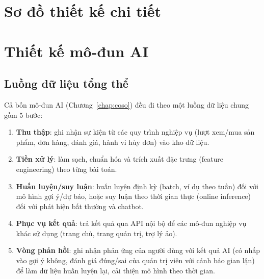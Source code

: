 \section{Sơ đồ thiết kế chi tiết}
\label{sec:sddchitiet}


\section{Thiết kế mô-đun AI}
\label{sec:thietkeAI}

\subsection{Luồng dữ liệu tổng thể}

Cả bốn mô-đun AI (Chương~\ref{chap:coso}) đều đi theo một luồng dữ liệu chung gồm 5 bước:
\begin{enumerate}
    \item \textbf{Thu thập}: ghi nhận sự kiện từ các quy trình nghiệp vụ (lượt xem/mua sản phẩm, đơn hàng, đánh giá, hành vi hủy đơn) vào kho dữ liệu.
    \item \textbf{Tiền xử lý}: làm sạch, chuẩn hóa và trích xuất đặc trưng (feature engineering) theo từng bài toán.
    \item \textbf{Huấn luyện/suy luận}: huấn luyện định kỳ (batch, ví dụ theo tuần) đối với mô hình gợi ý/dự báo, hoặc suy luận theo thời gian thực (online inference) đối với phát hiện bất thường và chatbot.
    \item \textbf{Phục vụ kết quả}: trả kết quả qua API nội bộ để các mô-đun nghiệp vụ khác sử dụng (trang chủ, trang quản trị, trợ lý ảo).
    \item \textbf{Vòng phản hồi}: ghi nhận phản ứng của người dùng với kết quả AI (có nhấp vào gợi ý không, đánh giá đúng/sai của quản trị viên với cảnh báo gian lận) để làm dữ liệu huấn luyện lại, cải thiện mô hình theo thời gian.
\end{enumerate}

